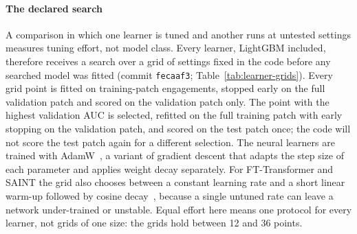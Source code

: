 \paragraph{The declared search}
A comparison in which one learner is tuned and another runs at untested settings measures tuning effort,
not model class. Every learner, LightGBM included, therefore receives a search over a grid of settings
fixed in the code before any searched model was fitted (commit \texttt{fecaaf3};
Table~\ref{tab:learner-grids}). Every grid point is fitted on training-patch engagements, stopped early on
the full validation patch and scored on the validation patch only. The point with the highest validation
AUC is selected, refitted on the full training patch with early stopping on the validation patch, and
scored on the test patch once; the code will not score the test patch again for a different selection.
The neural learners are trained with AdamW~\cite{loshchilov2019decoupled}, a variant of gradient descent
that adapts the step size of each parameter and applies weight decay separately. For FT-Transformer and
SAINT the grid also chooses between a constant learning rate and a short linear warm-up followed by cosine
decay~\cite{loshchilov2017sgdr}, because a single untuned rate can leave a network under-trained or
unstable. Equal effort here means one protocol for every learner, not grids of one size: the grids hold
between 12 and 36 points.

